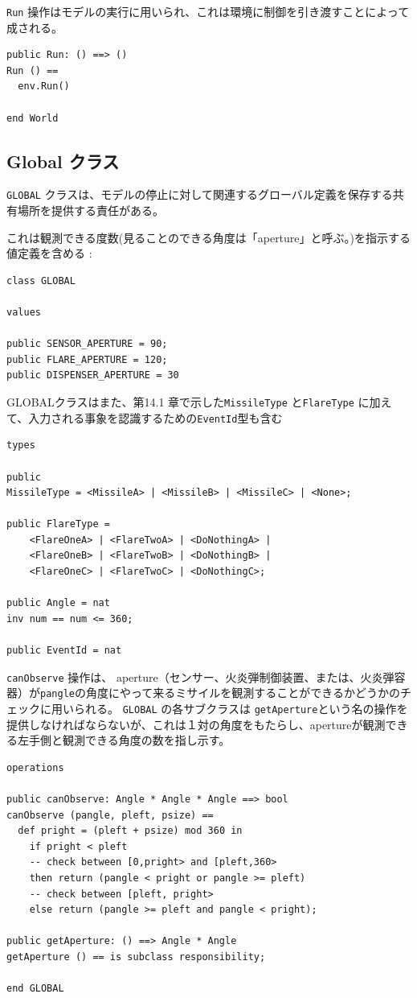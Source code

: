 \documentclass[\pformat,12pt]{jreport}
\begin{document}
\texttt{Run} 操作はモデルの実行に用いられ、これは環境に制御を引き渡すことによって成される。

\begin{lstlisting}
public Run: () ==> ()
Run () == 
  env.Run()

end World
\end{lstlisting}

\subsection{Global クラス}\label{sec:GlobalSeq}

 \texttt{GLOBAL} クラスは、モデルの停止に対して関連するグローバル定義を保存する共有場所を提供する責任がある。

これは観測できる度数(見ることのできる角度は「aperture」と呼ぶ。)を指示する値定義を含める :

\begin{lstlisting}
class GLOBAL

values

public SENSOR_APERTURE = 90;
public FLARE_APERTURE = 120;
public DISPENSER_APERTURE = 30
\end{lstlisting}

GLOBALクラスはまた、第14.1 章で示した\texttt{MissileType} と\texttt{FlareType}  に加えて、入力される事象を認識するための\texttt{EventId}型も含む
\newpage

\begin{lstlisting}
types

public 
MissileType = <MissileA> | <MissileB> | <MissileC> | <None>;

public FlareType =
    <FlareOneA> | <FlareTwoA> | <DoNothingA> | 
    <FlareOneB> | <FlareTwoB> | <DoNothingB> | 
    <FlareOneC> | <FlareTwoC> | <DoNothingC>;

public Angle = nat
inv num == num <= 360;

public EventId = nat
\end{lstlisting}

 \texttt{canObserve} 操作は、 aperture（センサー、火炎弾制御装置、または、火炎弾容器）が\texttt{pangle}の角度にやって来るミサイルを観測することができるかどうかのチェックに用いられる。
 \texttt{GLOBAL} の各サブクラスは \texttt{getAperture}という名の操作を提供しなければならないが、これは１対の角度をもたらし、apertureが観測できる左手側と観測できる角度の数を指し示す。
 
\begin{lstlisting}
operations

public canObserve: Angle * Angle * Angle ==> bool
canObserve (pangle, pleft, psize) ==
  def pright = (pleft + psize) mod 360 in
    if pright < pleft
    -- check between [0,pright> and [pleft,360>
    then return (pangle < pright or pangle >= pleft)
    -- check between [pleft, pright>
    else return (pangle >= pleft and pangle < pright);
       
public getAperture: () ==> Angle * Angle
getAperture () == is subclass responsibility;

end GLOBAL
\end{lstlisting}
\end{document}
